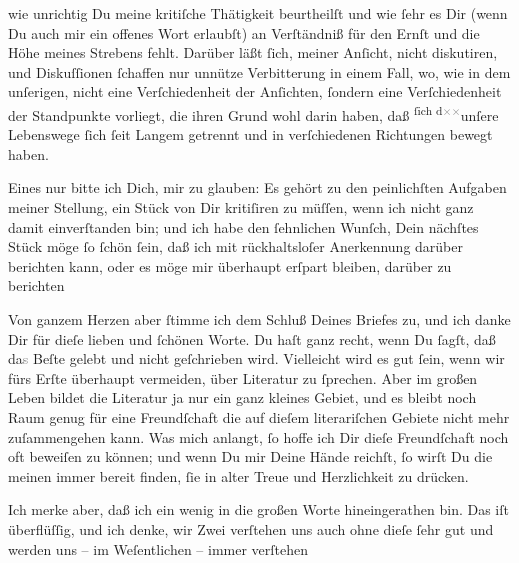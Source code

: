                wie unrichtig Du  meine kritiſche Thätigkeit
               beurtheilſt und \strikeout{\textcolor{gray}{mit}} wie{ }ſehr es Dir (wenn Du auch mir ein offenes Wort erlaubſt) an Verſtändniß
               für den Ernſt und die Höhe meines Strebens fehlt. Darüber läßt{ }ſich, meiner Anſicht,
               nicht diskutiren, und Diskuſſionen{ }ſchaffen nur 
               unnütze Verbitterung in einem Fall, wo, wie in dem {\pb}unſerigen, nicht eine Verſchiedenheit der Anſichten,{ }ſondern eine Verſchiedenheit
               der Standpunkte vorliegt, die ihren Grund wohl darin haben, daß \substVorne{}\textsuperscript{ſich d\textcolor{gray}{×}\-\textcolor{gray}{×}}\substDazwischen{}unſere\substHinten{} Lebenswege{ }ſich{ }ſeit Langem getrennt und in verſchiedenen Richtungen bewegt
               haben.\pend
           
\pstart
           Eines nur bitte ich Dich, mir zu glauben: Es gehört zu den peinlichſten Aufgaben
               meiner Stellung, ein Stück von Dir \strikeout{\textcolor{gray}{×}} kritiſiren zu müſſen, wenn ich nicht ganz damit einverſtanden bin; und ich
               habe den{ }ſehnlichen Wunſch, Dein nächſtes Stück möge{ }ſo{ }ſchön{ }ſein, daß ich mit
               rückhaltsloſer Anerkennung darüber berichten kann, oder es \strikeout{\textcolor{gray}{×}} möge mir überhaupt erſpart bleiben, darüber zu berichten{\dotsfive}\pend
           
\pstart
           Von ganzem Herzen  aber{ }ſtimme ich dem Schluß Deines Briefes zu, und ich danke Dir für dieſe
               lieben {\pb}und{ }ſchönen Worte. Du haſt ganz recht, wenn
               Du{ }ſagſt, daß da\textcolor{gray}{s} Beſte gelebt und nicht geſchrieben wird.
               Vielleicht wird es gut{ }ſein, wenn wir fürs Erſte überhaupt vermeiden, über Literatur
               zu{ }ſprechen. Aber im großen Leben bildet die Literatur ja nur ein ganz kleines
               Gebiet, und es bleibt noch Raum genug für eine Freundſchaft die auf dieſem
               literariſchen Gebiete nicht mehr zuſammengehen kann. Was mich anlangt,{ }ſo hoffe ich
               Dir dieſe Freundſchaft noch oft beweiſen zu können; und  wenn Du mir Deine Hände reichſt,{ }ſo wirſt Du die meinen immer bereit
               finden,{ }ſie \strikeout{\textcolor{gray}{×}\-\textcolor{gray}{×}\-\textcolor{gray}{×}} in alter Treue und Herzlichkeit zu drücken.\pend
           
\pstart
            Ich merke aber, daß ich ein wenig in die großen Worte hineingerathen bin. Das
               iſt überflüſſig, und ich denke, wir Zwei verſtehen uns {\pb}auch ohne dieſe{ }ſehr gut und werden uns – im Weſentlichen – immer verſtehen{\dotsfour}\pend
           
